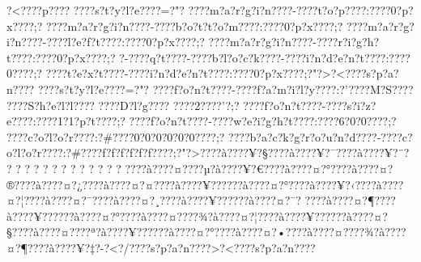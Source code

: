 \documentclass[11pt, openany]{book}
\begin{document}
{{{{{{{{{{{{{{{{{{{{{{{{{{{{{{{{{{{{{{{{{{{{{{{{{{{{{{{{{{{{{{{{{{{{{{{{{{{{{{{{{{{{{{{{{{{{{{{{{{{{{{{{{{{{{?\textless{}???\textbar{}?p???\textbar{}?
???\textbar{}?s?t?y?l?e???\textbar{}?=?"?
???\textbar{}?m?a?r?g?i?n???\textbar{}?-???\textbar{}?t?o?p???\textbar{}?:???\textbar{}?0?p?x???\textbar{}?;?
???\textbar{}?m?a?r?g?i?n???\textbar{}?-???\textbar{}?b?o?t?t?o?m???\textbar{}?:???\textbar{}?0?p?x???\textbar{}?;?
???\textbar{}?m?a?r?g?i?n???\textbar{}?-???\textbar{}?l?e?f?t???\textbar{}?:???\textbar{}?0?p?x???\textbar{}?;?
???\textbar{}?m?a?r?g?i?n???\textbar{}?-???\textbar{}?r?i?g?h?t???\textbar{}?:???\textbar{}?0?p?x???\textbar{}?;?
?-???\textbar{}?q?t???\textbar{}?-???\textbar{}?b?l?o?c?k???\textbar{}?-???\textbar{}?i?n?d?e?n?t???\textbar{}?:???\textbar{}?0???\textbar{}?;?
???\textbar{}?t?e?x?t???\textbar{}?-???\textbar{}?i?n?d?e?n?t???\textbar{}?:???\textbar{}?0?p?x???\textbar{}?;?"?\textgreater{}?\textless{}???\textbar{}?s?p?a?n???\textbar{}?
???\textbar{}?s?t?y?l?e???\textbar{}?=?"?
???\textbar{}?f?o?n?t???\textbar{}?-???\textbar{}?f?a?m?i?l?y???\textbar{}?:?'???\textbar{}?M?S???\textbar{}?
???\textbar{}?S?h?e?l?l???\textbar{}? ???\textbar{}?D?l?g???\textbar{}?
???\textbar{}?2???\textbar{}?'?;?
???\textbar{}?f?o?n?t???\textbar{}?-???\textbar{}?s?i?z?e???\textbar{}?:???\textbar{}?1?1?p?t???\textbar{}?;?
???\textbar{}?f?o?n?t???\textbar{}?-???\textbar{}?w?e?i?g?h?t???\textbar{}?:???\textbar{}?6?0?0???\textbar{}?;?
???\textbar{}?c?o?l?o?r???\textbar{}?:?\#???\textbar{}?0?0?0?0?0?0???\textbar{}?;?
???\textbar{}?b?a?c?k?g?r?o?u?n?d???\textbar{}?-???\textbar{}?c?o?l?o?r???\textbar{}?:?\#???\textbar{}?f?f?f?f?f?f???\textbar{}?;?"?\textgreater{}???\textbar{}?à???\textbar{}?¥?§???\textbar{}?à???\textbar{}?¥?¯???\textbar{}?à???\textbar{}?¥?¨?
? ? ? ? ? ? ? ? ? ? ? ? ?
???\textbar{}?à???\textbar{}?¤???\textbar{}?µ?à???\textbar{}?¥?€???\textbar{}?à???\textbar{}?¤?°???\textbar{}?à???\textbar{}?¤?®???\textbar{}?à???\textbar{}?¤?¿???\textbar{}?à???\textbar{}?¤?¤???\textbar{}?à???\textbar{}?¥?????\textbar{}?à???\textbar{}?¤?°???\textbar{}?à???\textbar{}?¥?‹???\textbar{}?à???\textbar{}?¤?¦???\textbar{}?à???\textbar{}?¤?¯???\textbar{}?à???\textbar{}?¤?¸???\textbar{}?à???\textbar{}?¥?????\textbar{}?à???\textbar{}?¤?¯?
???\textbar{}?à???\textbar{}?¤?¶???\textbar{}?à???\textbar{}?¥?????\textbar{}?à???\textbar{}?¤?°???\textbar{}?à???\textbar{}?¤???\textbar{}?¾?à???\textbar{}?¤?¦???\textbar{}?à???\textbar{}?¥?????\textbar{}?à???\textbar{}?¤?§???\textbar{}?à???\textbar{}?¤???\textbar{}?ª?à???\textbar{}?¥?????\textbar{}?à???\textbar{}?¤?°???\textbar{}?à???\textbar{}?¤?•???\textbar{}?à???\textbar{}?¤???\textbar{}?¾?à???\textbar{}?¤?¶???\textbar{}?à???\textbar{}?¥?‡?-?\textless{}?/???\textbar{}?s?p?a?n???\textbar{}?\textgreater{}?\textless{}???\textbar{}?s?p?a?n???\textbar{}?
}}}}}}}}}}}}}}}}}}}}}}}}}}}}}}}}}}}}}}}}}}}}}}}}}}}}}}}}}}}}}}}}}}}}}}}}}}}}}}}}}}}}}}}}}}}}}}}}}}}}}}}}}}}}}
\end{document}
